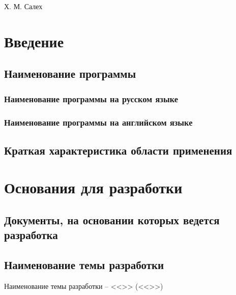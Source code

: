 \documentclass[a4paper,12pt,reqno]{article}
\begin{document}
	
	
	
	

	{Х. М. Салех}
	
	\firstPage
						\newpage
	\secondPage
						\newpage
	\thirdPage
						\newpage
	\section{Введение}
	\subsection{Наименование программы}
	\subsubsection{Наименование программы на русском языке}
	
	\subsubsection{Наименование программы на английском языке}
	
	\subsection{Краткая характеристика области применения}
	
	\newpage
	\section{Основания для разработки}
	\subsection{Документы, на основании которых ведется разработка}
	
	
	
	
	\subsection{Наименование темы разработки}
	
	Наименование темы разработки – <<>> (<<>>)
\end{document}
